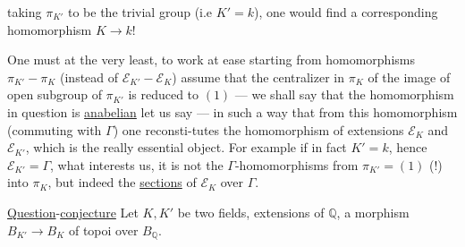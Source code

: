 taking $\pi_{K'}$ to be the trivial group (i.e $K'=k$), one would find a corresponding homomorphism $K\longrightarrow k$!

One must at the very least, to work at ease starting from homomorphisms $\pi_{K'}-\pi_K$ (instead of $\mathcal E_{K'}-\mathcal E_K$) assume that the centralizer in $\pi_K$ of the image of  open subgroup of $\pi_{K'}$ is reduced to $(1)$ --- we shall say that the homomorphism in question is \uline{anabelian} let us say --- in such a way that from this homomorphism (commuting with $\Gamma$) one reconsti-tutes the homomorphism of extensions $\mathcal E_K$ and $\mathcal E_{K'}$, which is the really essential object. For example if in fact $K'=k$, hence $\mathcal E_{K'}=\Gamma$, what interests us, it is not the $\Gamma$-homomorphisms from $\pi_{K'}=(1)$ (!) into $\pi_K$, but indeed the \uline{sections} of $\mathcal E_K$ over $\Gamma$.

\uline{Question}-\uline{conjecture} Let $K,K'$ be two fields,   extensions of $\mathbb Q$,   a morphism $B_{K'}\longrightarrow B_K$ of topoi over $B_{\mathbb Q}$.
